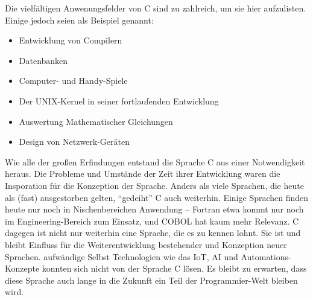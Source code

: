 \begin{appendices}
Die vielfältigen Anwenungsfelder von C sind zu zahlreich, um sie hier aufzulisten. Einige jedoch seien als Beispiel genannt:
\begin{itemize}
\item Entwicklung von Compilern
\item Datenbanken 
\item Computer- und Handy-Spiele
\item Der UNIX-Kernel in seiner fortlaufenden Entwicklung
\item Auswertung Mathematischer Gleichungen
\item Design von Netzwerk-Geräten
\end{itemize}

Wie alle der großen Erfindungen entstand die Sprache C aus einer Notwendigkeit heraus. Die Probleme und Umstände der Zeit ihrer Entwicklung waren die Insporation für die Konzeption der Sprache. Anders als viele Sprachen, die heute als (fast) ausgestorben gelten, \enquote{gedeiht} C auch weiterhin. Einige Sprachen finden heute nur noch in Nischenbereichen Anwendung -- Fortran etwa kommt nur noch im Engineering-Bereich zum Einsatz, und COBOL hat kaum mehr Relevanz. C dagegen ist nicht nur weiterhin eine Sprache, die es zu kennen lohnt. Sie ist und bleibt Einfluss für die Weiterentwicklung bestehender und Konzeption neuer Sprachen. aufwändige Selbst Technologien wie das IoT, AI und Automations-Konzepte konnten sich nicht von der Sprache C lösen. Es bleibt zu erwarten, dass diese Sprache auch lange in die Zukunft ein Teil der Programmier-Welt bleiben wird.
\end{appendices}
